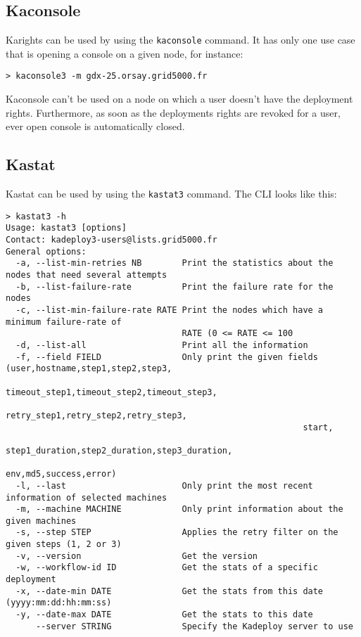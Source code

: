 \documentclass[a4wide,10pt,oneside]{book}
\begin{document}
\subsection{Kaconsole}\label{sec:kaconsole}
Karights can be used by using the \texttt{kaconsole} command. It has only one use case that is opening a console on a given node, for instance:
\begin{verbatim}
> kaconsole3 -m gdx-25.orsay.grid5000.fr
\end{verbatim}

Kaconsole can't be used on a node on which a user doesn't have the deployment rights. Furthermore, as soon as the deployments rights are revoked for a user, ever open console is automatically closed.

\subsection{Kastat}\label{sec:kastat}
Kastat can be used by using the \texttt{kastat3} command. The CLI looks like this:
\begin{small}
\begin{verbatim}
> kastat3 -h
Usage: kastat3 [options]
Contact: kadeploy3-users@lists.grid5000.fr
General options:
  -a, --list-min-retries NB        Print the statistics about the nodes that need several attempts
  -b, --list-failure-rate          Print the failure rate for the nodes
  -c, --list-min-failure-rate RATE Print the nodes which have a minimum failure-rate of 
                                   RATE (0 <= RATE <= 100
  -d, --list-all                   Print all the information
  -f, --field FIELD                Only print the given fields (user,hostname,step1,step2,step3,
                                                           timeout_step1,timeout_step2,timeout_step3,
                                                           retry_step1,retry_step2,retry_step3,
                                                           start,
                                                           step1_duration,step2_duration,step3_duration,
                                                           env,md5,success,error)
  -l, --last                       Only print the most recent information of selected machines
  -m, --machine MACHINE            Only print information about the given machines
  -s, --step STEP                  Applies the retry filter on the given steps (1, 2 or 3)
  -v, --version                    Get the version
  -w, --workflow-id ID             Get the stats of a specific deployment
  -x, --date-min DATE              Get the stats from this date (yyyy:mm:dd:hh:mm:ss)
  -y, --date-max DATE              Get the stats to this date
      --server STRING              Specify the Kadeploy server to use
\end{verbatim}
\end{small}
\end{document}
